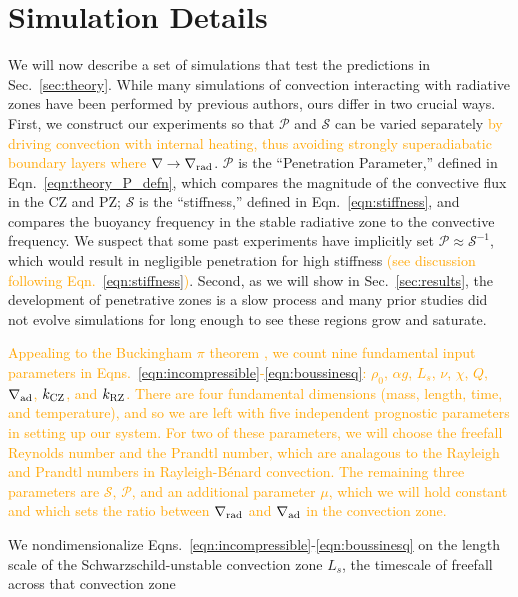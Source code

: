 \documentclass[twocolumn, linenumbers]{aastex631}
\newcommand{\gradrad}{\ensuremath{\nabla_{\rm{rad}}}}
\newcommand{\gradad}{\ensuremath{\nabla_{\rm{ad}}}}
\newcommand{\justgrad}{\ensuremath{\nabla}}
\newcommand{\mP}{\ensuremath{\mathcal{P}}}
\newcommand{\mS}{\ensuremath{\mathcal{S}}}
\newcommand{\editone}[1]{\textcolor{orange}{#1}}
\begin{document}
\section{Simulation Details}
We will now describe a set of simulations that test the predictions in Sec.~\ref{sec:theory}.
While many simulations of convection interacting with radiative zones have been performed by previous authors, ours differ in two crucial ways.
First, we construct our experiments so that $\mP$ and $\mS$ can be varied separately \editone{by driving convection with internal heating, thus avoiding strongly superadiabatic boundary layers where $\justgrad \rightarrow \gradrad$}.
$\mP$ is the ``Penetration Parameter,'' defined in Eqn.~\ref{eqn:theory_P_defn}, which compares the magnitude of the convective flux in the CZ and PZ; $\mS$ is the ``stiffness,'' defined in Eqn.~\ref{eqn:stiffness}, and compares the buoyancy frequency in the stable radiative zone to the convective frequency. 
We suspect that some past experiments have implicitly set $\mP \approx \mS^{-1}$, which would result in negligible penetration for high stiffness \editone{(see discussion following Eqn.~\ref{eqn:stiffness})}.
Second, as we will show in Sec.~\ref{sec:results}, the development of penetrative zones is a slow process and many prior studies did not evolve simulations for long enough to see these regions grow and saturate.

\editone{
    Appealing to the Buckingham $\pi$ theorem \citep{buckingham_1914}, we count nine fundamental input parameters in Eqns.~\ref{eqn:incompressible}-\ref{eqn:boussinesq}: $\rho_0$, $\alpha g$, $L_s$, $\nu$, $\chi$, $Q$, $\gradad$, $k_{\rm{CZ}}$, and $k_{\rm{RZ}}$.
    There are four fundamental dimensions (mass, length, time, and temperature), and so we are left with five independent prognostic parameters in setting up our system.
    For two of these parameters, we will choose the freefall Reynolds number and the Prandtl number, which are analagous to the Rayleigh and Prandtl numbers in Rayleigh-B\'{e}nard convection.
    The remaining three parameters are $\mS$, $\mP$, and an additional parameter $\mu$, which we will hold constant and which sets the ratio between $\gradrad$ and $\gradad$ in the convection zone.
}

We nondimensionalize Eqns.~\ref{eqn:incompressible}-\ref{eqn:boussinesq} on the length scale of the Schwarzschild-unstable convection zone $L_s$, the timescale of freefall across that convection zone 
\end{document}
